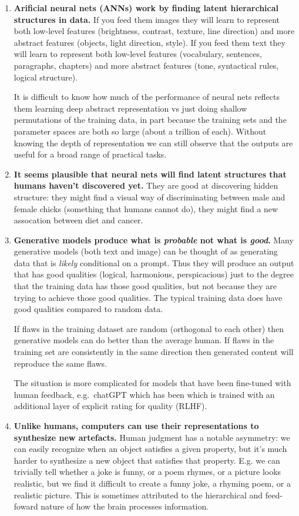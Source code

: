 \documentclass[
  11pt,
  letterpaper,
  DIV=11,
  numbers=noendperiod,
  oneside]{scrartcl}
\begin{document}
\begin{enumerate}
\def\labelenumi{\arabic{enumi}.}
\item
  \textbf{Arificial neural nets (ANNs) work by finding latent
  hierarchical structures in data.} If you feed them images they will
  learn to represent both low-level features (brightness, contrast,
  texture, line direction) and more abstract features (objects, light
  direction, style). If you feed them text they will learn to represent
  both low-level features (vocabulary, sentences, paragraphs, chapters)
  and more abstract features (tone, syntactical rules, logical
  structure).

  It is difficult to know how much of the performance of neural nets
  reflects them learning deep abstract representation vs just doing
  shallow permutations of the training data, in part because the
  training sets and the parameter spaces are both so large (about a
  trillion of each). Without knowing the depth of representation we can
  still observe that the outputs are useful for a broad range of
  practical tasks.
\item
  \textbf{It seems plausible that neural nets will find latent
  structures that humans haven't discovered yet.} They are good at
  discovering hidden structure: they might find a visual way of
  discriminating between male and female chicks (something that humans
  cannot do), they might find a new assocation between diet and cancer.
\item
  \textbf{Generative models produce what is \emph{probable} not what is
  \emph{good}.} Many generative models (both text and image) can be
  thought of as generating data that is \emph{likely} conditional on a
  prompt. Thus they will produce an output that has good qualities
  (logical, harmonious, perspicacious) just to the degree that the
  training data has those good qualities, but not because they are
  trying to achieve those good qualities. The typical training data does
  have good qualities compared to random data.

  If flaws in the training dataset are random (orthogonal to each other)
  then generative models can do better than the average human. If flaws
  in the training set are consistently in the same direction then
  generated content will reproduce the same flaws.

  The situation is more complicated for models that have been fine-tuned
  with human feedback, e.g.~chatGPT which has been which is trained with
  an additional layer of explicit rating for quality (RLHF).
\item
  \textbf{Unlike humans, computers can use their representations to
  synthesize new artefacts.} Human judgment has a notable asymmetry: we
  can easily recognize when an object satisfies a given property, but
  it's much harder to synthesize a new object that satisfies that
  property. E.g. we can trivially tell whether a joke is funny, or a
  poem rhymes, or a picture looks realistic, but we find it difficult to
  create a funny joke, a rhyming poem, or a realistic picture. This is
  sometimes attributed to the hierarchical and feed-foward nature of how
  the brain processes information.


\end{enumerate}
\end{document}
